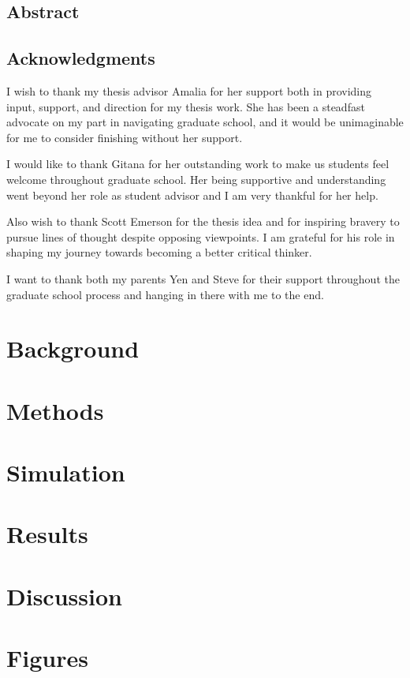 
\frontmatter

\thetitlepage
\cleardoublepage
\setcounter{page}{1}

\section{Abstract}
\uwabstract
\cleardoublepage

\section{Acknowledgments}
I wish to thank my thesis advisor Amalia for her support both in providing input, support, and direction for my thesis work. 
She has been a steadfast advocate on my part in navigating graduate school, and it would be unimaginable for me to consider finishing without her support.

I would like to thank Gitana for her outstanding work to make us students feel welcome throughout graduate school.
Her being supportive and understanding went beyond her role as student advisor and I am very thankful for her help. 

Also wish to thank Scott Emerson for the thesis idea and for inspiring bravery to pursue lines of thought despite opposing viewpoints.
I am grateful for his role in shaping my journey towards becoming a better critical thinker. 

I want to thank both my parents Yen and Steve for their support throughout the graduate school process and hanging in there with me to the end.

\clearpage

\tableofcontents\clearpage
\listoffigures\clearpage
\listoftables\clearpage

\mainmatter

\chapter{Background}

\chapter{Methods}

\chapter{Simulation}

\chapter{Results}

\chapter{Discussion}

\chapter{Figures}





